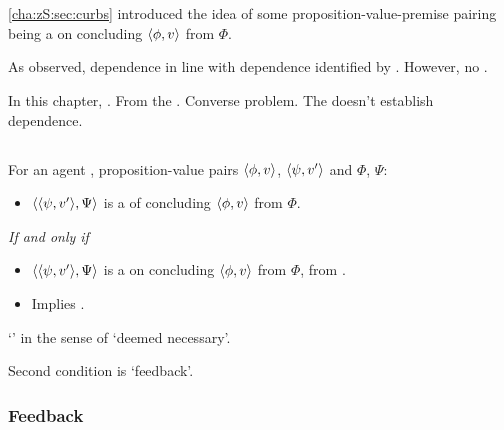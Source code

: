 \chapter{}
\label{cha:zS:sec:requs}

\begin{note}
  \autoref{cha:zS:sec:curbs} introduced the idea of some proposition-value-premise pairing being a \curb{} on concluding \(\langle \phi, v \rangle\) from \(\Phi\).

  As observed, dependence in line with dependence identified by \qWhyV{}.
  However, no \ros{}.

  In this chapter, \requ{}.
  From the \agpe{}.
  Converse problem.
  The \agpe{} doesn't establish dependence.

  
\end{note}

\section{}
\label{sec:requ3}

\begin{note}
  \begin{definition}[\requ{2}]
    \label{def:requ}
    For an agent \vAgent{}, proposition-value pairs \(\langle \phi, v \rangle\), \(\langle \psi, v' \rangle\) and  \(\Phi\), \(\Psi\):

    \begin{itemize}
    \item
      \(\langle \langle \psi, v' \rangle, \Psi \rangle\) is a \requ{} of concluding \(\langle \phi, v \rangle\) from \(\Phi\).
    \end{itemize}

    \emph{If and only if}

    \begin{itemize}
    \item
      \(\langle \langle \psi, v' \rangle, \Psi \rangle\) is a \curb{} on concluding \(\langle \phi, v \rangle\) from \(\Phi\), from .
    \item
      Implies \curb{}.
    \end{itemize}
    \vspace{-\baselineskip}
  \end{definition}

  `' in the sense of `deemed necessary'.

  Second condition is `feedback'.
\end{note}

\subsection{Feedback}

